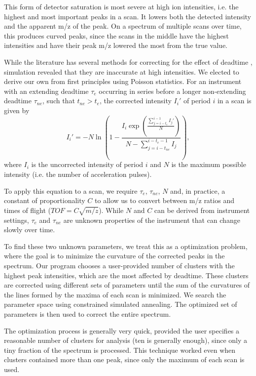 \documentclass[10pt]{scrartcl}
\begin{document}
This form of detector saturation is most severe at high ion intensities, i.e. the highest and most important peaks in a scan. It lowers both the detected intensity and the apparent m/z of the peak. On a spectrum of multiple scans over time, this produces curved peaks, since the scans in the middle have the highest intensities and have their peak m/z lowered the most from the true value.

While the literature has several methods for correcting for the effect of deadtime \cite{}, simulation revealed that they are inaccurate at high intensities. We elected to derive our own from first principles using Poisson statistics. For an instrument with an extending deadtime $\tau_{e}$ occurring in series before a longer non-extending deadtime $\tau_{ne}$, such that $t_{ne}>t_e$, the corrected intensity $I_i'$ of period $i$ in a scan is given by
\begin{equation}
I_i'=-N\ln{\left(1-\frac{I_i\exp{\left(\frac{\sum_{j=i-t_e}^{i-1}I_j'}{N}\right)}}{N-\sum_{j=i-t_{ne}}^{i-t_e-1}I_j}\right)},
\end{equation}
where $I_i$ is the uncorrected intensity of period $i$ and $N$ is the maximum possible intensity (i.e. the number of acceleration pulses).

To apply this equation to a scan, we require $\tau_{e}$, $\tau_{ne}$, $N$ and, in practice, a constant of proportionality $C$ to allow us to convert between m/z ratios and times of flight ($TOF=C\sqrt{m/z}$). While $N$ and $C$ can be derived from instrument settings, $\tau_{e}$ and $\tau_{ne}$ are unknown properties of the instrument that can change slowly over time.

To find these two unknown parameters, we treat this as a optimization problem, where the goal is to minimize the curvature of the corrected peaks in the spectrum. Our program chooses a user-provided number of clusters with the highest peak intensities, which are the most affected by deadtime. These clusters are corrected using different sets of parameters until the sum of the curvatures of the lines formed by the maxima of each scan is minimized. We search the parameter space using constrained simulated annealing. The optimized set of parameters is then used to correct the entire spectrum.

The optimization process is generally very quick, provided the user specifies a reasonable number of clusters for analysis (ten is generally enough), since only a tiny fraction of the spectrum is processed. This technique worked even when clusters contained more than one peak, since only the maximum of each scan is used.
\end{document}
